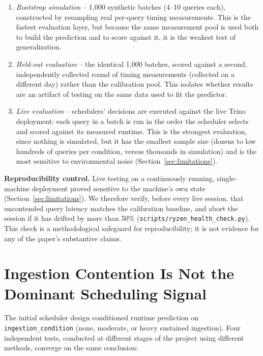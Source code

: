 \documentclass[conference]{IEEEtran}
\begin{document}
\begin{enumerate}
\item \emph{Bootstrap simulation} -- 1{,}000 synthetic batches (4--10 queries each), constructed by resampling real per-query timing measurements. This is the fastest evaluation layer, but because the same measurement pool is used both to build the prediction and to score against it, it is the weakest test of generalization.
\item \emph{Held-out evaluation} -- the identical 1{,}000 batches, scored against a second, independently collected round of timing measurements (collected on a different day) rather than the calibration pool. This isolates whether results are an artifact of testing on the same data used to fit the predictor.
\item \emph{Live evaluation} -- schedulers' decisions are executed against the live Trino deployment: each query in a batch is run in the order the scheduler selects and scored against its measured runtime. This is the strongest evaluation, since nothing is simulated, but it has the smallest sample size (dozens to low hundreds of queries per condition, versus thousands in simulation) and is the most sensitive to environmental noise (Section~\ref{sec:limitations}).
\end{enumerate}

\textbf{Reproducibility control.} Live testing on a continuously running, single-machine deployment proved sensitive to the machine's own state (Section~\ref{sec:limitations}). We therefore verify, before every live session, that uncontended query latency matches the calibration baseline, and abort the session if it has drifted by more than 50\% (\texttt{scripts/ryzen\_health\_check.py}). This check is a methodological safeguard for reproducibility; it is not evidence for any of the paper's substantive claims.

\section{Ingestion Contention Is Not the Dominant Scheduling Signal}
\label{sec:ingestion}

The initial scheduler design conditioned runtime prediction on \texttt{ingestion\_condition} (none, moderate, or heavy sustained ingestion). Four independent tests, conducted at different stages of the project using different methods, converge on the same conclusion:
\end{document}
